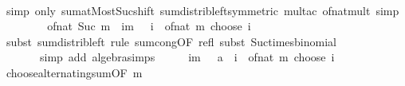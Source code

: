 \begin{isabellebody}
\ \ \ \ \isamarkupfalse%
\ {\isacharparenleft}{\kern0pt}simp\ only{\isacharcolon}{\kern0pt}\ sum{\isachardot}{\kern0pt}atMost{\isacharunderscore}{\kern0pt}Suc{\isacharunderscore}{\kern0pt}shift\ sum{\isacharunderscore}{\kern0pt}distrib{\isacharunderscore}{\kern0pt}left{\isacharbrackleft}{\kern0pt}symmetric{\isacharbrackright}{\kern0pt}\ mult{\isacharunderscore}{\kern0pt}ac\ of{\isacharunderscore}{\kern0pt}nat{\isacharunderscore}{\kern0pt}mult{\isacharparenright}{\kern0pt}\ simp\isanewline
\ \ \isamarkupfalse%
\ \isamarkupfalse%
\ {\isachardoublequoteopen}{\isasymdots}\ {\isacharequal}{\kern0pt}\ {\isacharminus}{\kern0pt}\ of{\isacharunderscore}{\kern0pt}nat\ {\isacharparenleft}{\kern0pt}Suc\ m{\isacharparenright}{\kern0pt}\ {\isacharasterisk}{\kern0pt}\ {\isacharparenleft}{\kern0pt}{\isasymSum}i{\isasymle}m{\isachardot}{\kern0pt}\ {\isacharparenleft}{\kern0pt}{\isacharminus}{\kern0pt}{}{\isacharparenright}{\kern0pt}\ {\isacharcircum}{\kern0pt}\ i\ {\isacharasterisk}{\kern0pt}\ of{\isacharunderscore}{\kern0pt}nat\ {\isacharparenleft}{\kern0pt}m\ choose\ i{\isacharparenright}{\kern0pt}{\isacharparenright}{\kern0pt}{\isachardoublequoteclose}\isanewline
\ \ \ \ \isamarkupfalse%
\ {\isacharparenleft}{\kern0pt}subst\ sum{\isacharunderscore}{\kern0pt}distrib{\isacharunderscore}{\kern0pt}left{\isacharcomma}{\kern0pt}\ rule\ sum{\isachardot}{\kern0pt}cong{\isacharbrackleft}{\kern0pt}OF\ refl{\isacharbrackright}{\kern0pt}{\isacharcomma}{\kern0pt}\ subst\ Suc{\isacharunderscore}{\kern0pt}times{\isacharunderscore}{\kern0pt}binomial{\isacharparenright}{\kern0pt}\isanewline
\ \ \ \ \ \ \ {\isacharparenleft}{\kern0pt}simp\ add{\isacharcolon}{\kern0pt}\ algebra{\isacharunderscore}{\kern0pt}simps{\isacharparenright}{\kern0pt}\isanewline
\ \ \isamarkupfalse%
\ \isamarkupfalse%
\ {\isachardoublequoteopen}{\isacharparenleft}{\kern0pt}{\isasymSum}i{\isasymle}m{\isachardot}{\kern0pt}\ {\isacharparenleft}{\kern0pt}{\isacharminus}{\kern0pt}{}\ {\isacharcolon}{\kern0pt}{\isacharcolon}{\kern0pt}\ {\isacharprime}{\kern0pt}a{\isacharparenright}{\kern0pt}\ {\isacharcircum}{\kern0pt}\ i\ {\isacharasterisk}{\kern0pt}\ of{\isacharunderscore}{\kern0pt}nat\ {\isacharparenleft}{\kern0pt}{\isacharparenleft}{\kern0pt}m\ choose\ i{\isacharparenright}{\kern0pt}{\isacharparenright}{\kern0pt}{\isacharparenright}{\kern0pt}\ {\isacharequal}{\kern0pt}\ {}{\isachardoublequoteclose}\isanewline
\ \ \ \ \isamarkupfalse%
\ choose{\isacharunderscore}{\kern0pt}alternating{\isacharunderscore}{\kern0pt}sum{\isacharbrackleft}{\kern0pt}OF\ {\isacartoucheopen}m\ {\isachargreater}{\kern0pt}\ {}{\isacartoucheclose}{\isacharbrackright}{\kern0pt}\ \isamarkupfalse%

\end{isabellebody}
